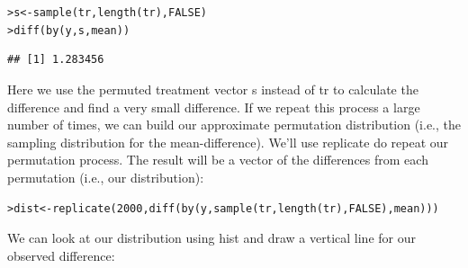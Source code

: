 \documentclass[12pt]{article}\usepackage[]{graphicx}\usepackage[]{color}
\makeatletter
\newcommand{\hlnum}[1]{\textcolor[rgb]{0.82,0.78,0.62}{#1}}%
\newcommand{\hlstd}[1]{\textcolor[rgb]{0.882,0.878,0.898}{#1}}%
\newcommand{\hlkwb}[1]{\textcolor[rgb]{0.902,0.675,0.196}{#1}}%
\newcommand{\hlkwd}[1]{\textcolor[rgb]{0.733,0.388,0.812}{#1}}%
\newenvironment{kframe}{%
 \def\at@end@of@kframe{}%
 \ifinner\ifhmode%
  \def\at@end@of@kframe{\end{minipage}}%
  \begin{minipage}{\columnwidth}%
 \fi\fi%
 \def\FrameCommand##1{\hskip\@totalleftmargin \hskip-\fboxsep
 \colorbox{shadecolor}{##1}\hskip-\fboxsep
     \hskip-\linewidth \hskip-\@totalleftmargin \hskip\columnwidth}%
 \MakeFramed {\advance\hsize-\width
   \@totalleftmargin\z@ \linewidth\hsize
   \@setminipage}}%
 {\par\unskip\endMakeFramed%
 \at@end@of@kframe}
\newenvironment{knitrout}{}{} %
\makeatother
\begin{document}
\begin{flushleft}
\begin{knitrout}
\color{fgcolor}\begin{kframe}
\begin{alltt}
\hlstd{> }\hlstd{s} \hlkwb{<-} \hlkwd{sample}\hlstd{(tr,} \hlkwd{length}\hlstd{(tr),} \hlnum{FALSE}\hlstd{)}
\hlstd{> }\hlkwd{diff}\hlstd{(}\hlkwd{by}\hlstd{(y, s, mean))}
\end{alltt}
\begin{verbatim}
## [1] 1.283456
\end{verbatim}
\end{kframe}
\end{knitrout}

Here we use the permuted treatment vector s instead of tr to calculate the difference and find a very small difference. If we repeat this process a large number of times, we can build our approximate permutation distribution (i.e., the sampling distribution for the mean-difference). We'll use replicate do repeat our permutation process. The result will be a vector of the differences from each permutation (i.e., our distribution):

\begin{knitrout}
\color{fgcolor}\begin{kframe}
\begin{alltt}
\hlstd{> }\hlstd{dist} \hlkwb{<-} \hlkwd{replicate}\hlstd{(}\hlnum{2000}\hlstd{,} \hlkwd{diff}\hlstd{(}\hlkwd{by}\hlstd{(y,} \hlkwd{sample}\hlstd{(tr,} \hlkwd{length}\hlstd{(tr),} \hlnum{FALSE}\hlstd{), mean)))}
\end{alltt}
\end{kframe}
\end{knitrout}

We can look at our distribution using hist and draw a vertical line for our observed difference:


\end{flushleft}
\end{document}
